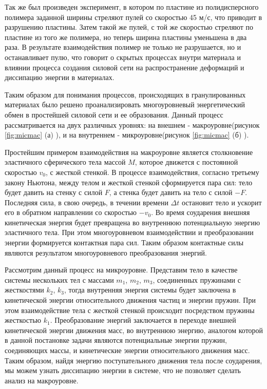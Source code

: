 Так же был произведен эксперимент, в котором по пластине из полидисперсного полимера заданной ширины стреляют пулей со скоростью 45 м/с, что приводит в разрушению пластины. Затем такой же пулей, с той же скоростью стреляют по пластине из того же полимера, но теперь ширина пластины уменьшена в два раза. 
В результате взаимодействия полимер не только не разрушается, но и останавливает пулю, что говорит о скрытых процессах внутри материала и влиянии процесса создания силовой сети на распространение деформаций и диссипацию энергии в материалах.

Таким образом для понимания процессов, происходящих в гранулированных материалах было решено проанализировать многоуровневый энергетический обмен в простейшей силовой сети и ее образования. Данный процесс рассматривается на двух различных уровнях: на внешнем - макроуровне(рисунок \ref{fig:micmac} (а) ), и на внутреннем - микроуровне(рисунок \ref{fig:micmac} (б) ). 

Простейшим примером взаимодействия на макроуровне является столкновение эластичного сферического тела массой $M$, которое движется с постоянной скоростью $v_0$, с жесткой стенкой. В процессе взаимодействия, согласно третьему закону Ньютона, между телом и жесткой стенкой сформируется пара сил: тело будет давить на стенку с силой $F$, а стенка будет давить на тело с силой $-F$. Последняя сила, в свою очередь, в течении времени $\Delta t$ остановит тело и ускорит его в обратном направлении со скоростью $-v_0$. Во время соударения внешняя кинетическая энергия будет превращена во внутреннюю потенциальную энергию эластичного тела. При этом многоуровневом взаимодействии и преобразовании энергии формируется контактная пара сил. Таким образом контактные силы являются результатом многоуровневого преобразования энергий.

Рассмотрим данный процесс на микроуровне. Представим тело в качестве системы нескольких тел с массами $m_1$, $m_2$, $m_3$, соединенных пружинами с жесткостями $k_2$, $k_3$, тогда внутренняя энергия системы будет заключена в кинетической энергии относительного движения частиц и энергии пружин. При этом взаимодействие тела с жесткой стенкой происходит посредством пружины жесткостью $k_1$. Преобразование энергий заключается в переходе внешней кинетической энергии движения масс, во внутреннюю энергию, аналогом которой в данной постановке задачи являются потенциальные энергии пружин, соединяющих массы, и кинетические энергии относительного движения масс. Таким образом, найдя энергию поступательного движения тела после соударения, мы можем узнать диссипацию энергии в системе, что не позволяет сделать анализ на макроуровне.

